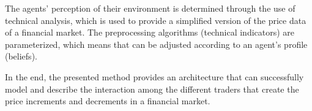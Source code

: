 The agents' perception of their environment is determined through the use of
technical analysis, which is used to provide a simplified version of the price
data of a financial market. The preprocessing algorithms (technical indicators)
are parameterized, which means that can be adjusted according to an agent's
profile (beliefs).

In the end, the presented method provides an architecture that can successfully
model and describe the interaction among the different traders that create the
price increments and decrements in a financial market.



